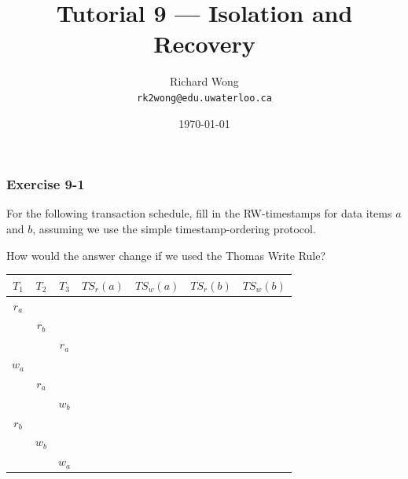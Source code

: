 

\def\ojoin{\setbox0=\hbox{$\bowtie$}%
  \rule[-.02ex]{.25em}{.4pt}\llap{\rule[\ht0]{.25em}{.4pt}}}
\def\leftouterjoin{\mathbin{\ojoin\mkern-5.8mu\bowtie}}

\title{Tutorial 9 --- Isolation and Recovery }

\author{Richard Wong \\ \small \texttt{rk2wong@edu.uwaterloo.ca}}
\date{\today}




\begin{frame}
  \titlepage

\end{frame}


\begin{frame}
\frametitle{Exercise 9-1}

For the following transaction schedule, fill in the RW-timestamps for data items $a$ and $b$, assuming we use the simple timestamp-ordering protocol.

How would the answer change if we used the Thomas Write Rule?

\begin{center}
\begin{tabular}{ | c c c || c c c c | }
  \hline
  $T_1$ & $T_2$ & $T_3$ & $TS_r(a)$ & $TS_w(a)$ & $TS_r(b)$ & $TS_w(b)$ \\
  \hline
  $r_a$ &       &       &           &           &           &           \\
        & $r_b$ &       &           &           &           &           \\
        &       & $r_a$ &           &           &           &           \\
  $w_a$ &       &       &           &           &           &           \\
        & $r_a$ &       &           &           &           &           \\
        &       & $w_b$ &           &           &           &           \\
  $r_b$ &       &       &           &           &           &           \\
        & $w_b$ &       &           &           &           &           \\
        &       & $w_a$ &           &           &           &           \\
  \hline
\end{tabular}
\end{center}

\end{frame}


